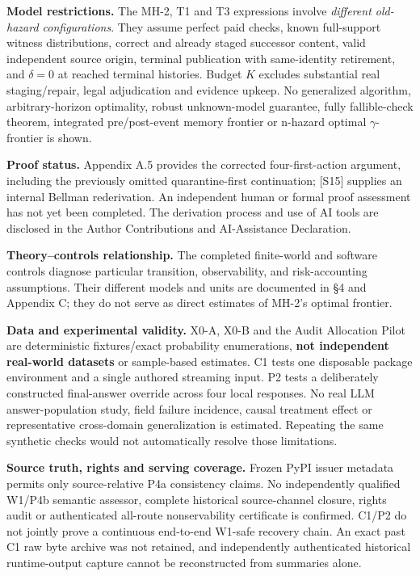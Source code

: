 \documentclass[
  10pt,
  american,
  a4paper,
]{article}
\begin{document}
\textbf{Model restrictions.} The MH-2, T1 and T3 expressions involve
\emph{different old-hazard configurations}. They assume perfect paid
checks, known full-support witness distributions, correct and already
staged successor content, valid independent source origin, terminal
publication with same-identity retirement, and \(\delta=0\) at reached
terminal histories. Budget \(K\) excludes substantial real
staging/repair, legal adjudication and evidence upkeep. No generalized
algorithm, arbitrary-horizon optimality, robust unknown-model guarantee,
fully fallible-check theorem, integrated pre/post-event memory frontier
or n-hazard optimal \(\gamma\)-frontier is shown.

\textbf{Proof status.} Appendix A.5 provides the corrected
four-first-action argument, including the previously omitted
quarantine-first continuation; {[}S15{]} supplies an internal Bellman
rederivation. An independent human or formal proof assessment has not
yet been completed. The derivation process and use of AI tools are
disclosed in the Author Contributions and AI-Assistance Declaration.

\textbf{Theory--controls relationship.} The completed finite-world and
software controls diagnose particular transition, observability, and
risk-accounting assumptions. Their different models and units are
documented in §4 and Appendix C; they do not serve as direct estimates
of MH-2's optimal frontier.

\textbf{Data and experimental validity.} X0-A, X0-B and the Audit
Allocation Pilot are deterministic fixtures/exact probability
enumerations, \textbf{not independent real-world datasets} or
sample-based estimates. C1 tests one disposable package environment and
a single authored streaming input. P2 tests a deliberately constructed
final-answer override across four local responses. No real LLM
answer-population study, field failure incidence, causal treatment
effect or representative cross-domain generalization is estimated.
Repeating the same synthetic checks would not automatically resolve
those limitations.

\textbf{Source truth, rights and serving coverage.} Frozen PyPI issuer
metadata permits only source-relative P4a consistency claims. No
independently qualified W1/P4b semantic assessor, complete historical
source-channel closure, rights audit or authenticated all-route
nonservability certificate is confirmed. C1/P2 do not jointly prove a
continuous end-to-end W1-safe recovery chain. An exact past C1 raw byte
archive was not retained, and independently authenticated historical
runtime-output capture cannot be reconstructed from summaries alone.
\end{document}
